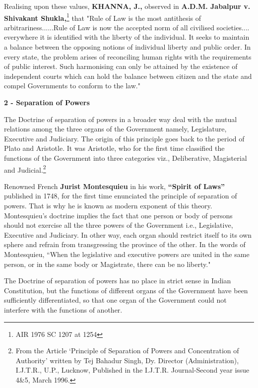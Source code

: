 \begin{multicols}{2}
\vspace{-.3cm}

\noi
Realising upon these values, \textbf{KHANNA, J.,} observed in \textbf{A.D.M. Jabalpur v. Shivakant Shukla,}\footnote{AIR 1976 SC 1207 at 1254} that "Rule of Law is the most antithesis of arbitrariness......Rule of Law is now the accepted norm of all civilised societies.... everywhere it is identified with the liberty of the
individual. It seeks to maintain a balance between the opposing notions of individual liberty and
public order. In every state, the problem arises of reconciling human rights with the requirements
of public interest. Such harmonising can only be attained by the existence of independent courts
which can hold the balance between citizen and the state and compel Governments to conform to
the law."

\noi
{\large \bfseries 2 - Separation of Powers}

\noi
The Doctrine of separation of powers in a broader way deal with the mutual relations among the
three organs of the Government namely, Legislature, Executive and Judiciary. The origin of this
principle goes back to the period of Plato and Aristotle. It was Aristotle, who for the first time classified the functions of the Government into three categories viz., Deliberative, Magisterial
and Judicial.\footnote{From the Article ‘Principle of Separation of Powers and Concentration of Authority’ written by Tej Bahadur Singh, Dy. Director (Administration), I.J.T.R., U.P., Lucknow, Published in the I.J.T.R. Journal-Second year issue 4\&5, March 1996.}

\noi
Renowned French \textbf{Jurist Montesquieu} in his work, \textbf{“Spirit of Laws”} published in 1748, for the
first time enunciated the principle of separation of powers. That is why he is known as modern
exponent of this theory. Montesquieu's doctrine implies the fact that one person or body of persons
should not exercise all the three powers of the Government i.e., Legislative, Executive and
Judiciary. In other way, each organ should restrict itself to its own sphere and refrain from
transgressing the province of the other. In the words of Montesquieu, “When the legislative and
executive powers are united in the same person, or in the same body or Magistrate, there can be
no liberty."

\noi
The Doctrine of separation of powers has no place in strict sense in Indian Constitution, but the
functions of different organs of the Government have been sufficiently differentiated, so that one
organ of the Government could not interfere with the functions of another.


\end{multicols}
